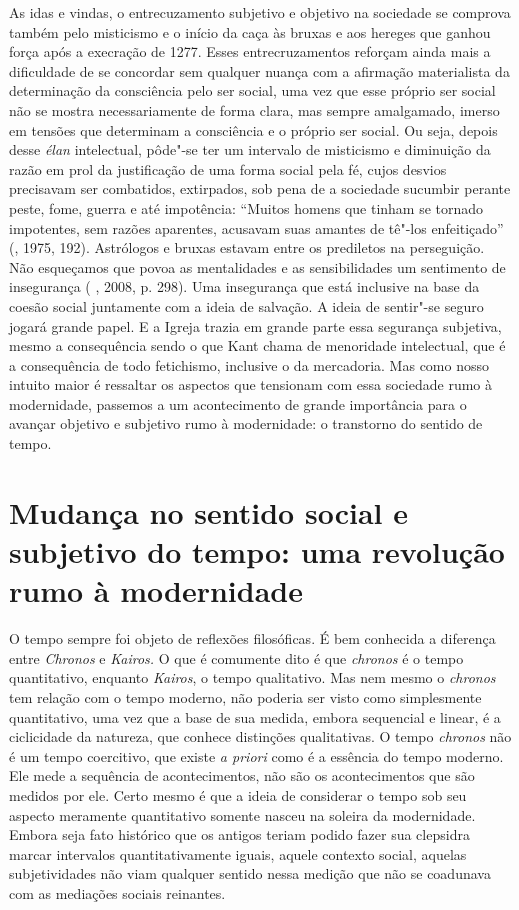 As idas e vindas, o entrecuzamento subjetivo e objetivo na sociedade se
comprova também pelo misticismo e o início da caça às bruxas e aos
hereges que ganhou força após a execração de 1277. Esses entrecruzamentos
reforçam ainda mais a dificuldade de se concordar sem qualquer nuança com a
afirmação materialista da determinação da consciência pelo ser social,
uma vez que esse próprio ser social não se mostra necessariamente de
forma clara, mas sempre amalgamado, imerso em tensões que determinam a
consciência e o próprio ser social. Ou seja, depois desse \emph{élan}
intelectual, pôde"-se ter um intervalo de misticismo e diminuição da
razão em prol da justificação de uma forma social pela fé, cujos desvios
precisavam ser combatidos, extirpados, sob pena de a sociedade sucumbir
perante peste, fome, guerra e até impotência: ``Muitos homens que tinham
se tornado impotentes, sem razões aparentes, acusavam suas amantes de
tê"-los enfeitiçado'' (, 1975, 192). Astrólogos e bruxas estavam
entre os prediletos na perseguição. Não esqueçamos que povoa as
mentalidades e as sensibilidades um sentimento de insegurança ( ,
2008, p. 298). Uma insegurança que está inclusive na base da coesão
social juntamente com a ideia de salvação. A ideia de sentir"-se seguro
jogará grande papel. E a Igreja trazia em grande parte essa segurança
subjetiva, mesmo a consequência sendo o que Kant chama de menoridade
intelectual, que é a consequência de todo fetichismo, inclusive o da
mercadoria. Mas como nosso intuito maior é ressaltar os aspectos que
tensionam com essa sociedade rumo à modernidade, passemos a um
acontecimento de grande importância para o avançar objetivo e subjetivo
rumo à modernidade: o transtorno do sentido de tempo.

\section{Mudança no sentido social e subjetivo do tempo: uma revolução rumo à modernidade}

O tempo sempre foi objeto de reflexões filosóficas. É bem conhecida a
diferença entre \emph{Chronos} e \emph{Kairos.} O que é comumente dito é
que \emph{chronos} é o tempo quantitativo, enquanto \emph{Kairos}, o
tempo qualitativo. Mas nem mesmo o \emph{chronos} tem relação com o
tempo moderno, não poderia ser visto como simplesmente quantitativo, uma
vez que a base de sua medida, embora sequencial e linear, é a
ciclicidade da natureza, que conhece distinções qualitativas. O tempo
\emph{chronos} não é um tempo coercitivo, que existe \emph{a priori}
como é a essência do tempo moderno. Ele mede a sequência de
acontecimentos, não são os acontecimentos que são medidos por ele. Certo
mesmo é que a ideia de considerar o tempo sob seu aspecto meramente
quantitativo somente nasceu na soleira da modernidade. Embora seja fato
histórico que os antigos teriam podido fazer sua clepsidra marcar
intervalos quantitativamente iguais, aquele contexto social, aquelas
subjetividades não viam qualquer sentido nessa medição que não se
coadunava com as mediações sociais reinantes.

